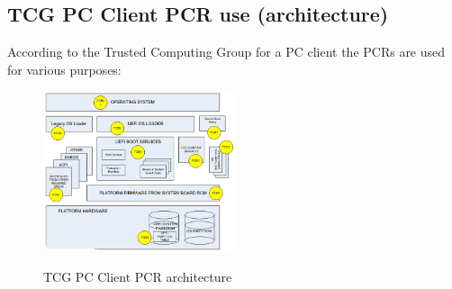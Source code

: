 \subsection{TCG PC Client PCR use (architecture)}
According to the Trusted Computing Group for a PC client the PCRs are
used for various purposes:
\begin{figure}
  \centering
  \includegraphics[width=0.5\textwidth]{img/TCG PC Client.png}
  \label{fig:TCG PC Client PCR use}
  \caption{TCG PC Client PCR architecture}
\end{figure}

